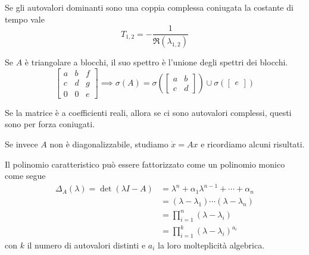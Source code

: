 Se gli autovalori dominanti sono una coppia complessa coniugata la costante di tempo vale
\begin{equation*}
	\boxed{T_{1,2} =-\frac{1}{\Re\left(\lambda _{1,2}\right)}}
\end{equation*}
\begin{rem}
	Se $A$ è triangolare a blocchi, il suo spettro è l'unione degli spettri dei blocchi.
	\begin{equation*}
        \left[
            \begin{array}{cc|c}
			        a & b & f \\
			        c & d & g\\
		          \hline
                  0 & 0 & e
		      \end{array}
        \right] \implies \sigma \left(A\right) =\sigma \left(\begin{bmatrix}
		a & b\\
		c & d
		\end{bmatrix}\right) \cup \sigma \left(\begin{bmatrix}
		e
		\end{bmatrix}\right)
	\end{equation*}
\end{rem}
\begin{rem}
	Se la matrice è a coefficienti reali, allora se ci sono autovalori complessi, questi sono per forza coniugati.
\end{rem}
Se invece $A$ non è diagonalizzabile, studiamo $\dot{x} =Ax$ e ricordiamo alcuni risultati.
\begin{rem}
	Il polinomio caratteristico può essere fattorizzato come un polinomio monico come segue\begin{equation*}
	\begin{aligned}
		\Delta _A\left(\lambda \right) =\det\left(\lambda I-A\right) & =\lambda ^n +\alpha _1 \lambda ^{n-1} +\cdots +\alpha _n                    \\
		                                                                       & =\left(\lambda -\lambda _1\right) \cdots \left(\lambda -\lambda _n\right) \\
		                                                                       & =\prod^n_{i=1}\left(\lambda -\lambda _i\right)                   \\
		                                                                       & =\prod^k_{i=1}\left(\lambda -\lambda _i\right)^{a_i}             
	\end{aligned}
	\end{equation*}
	con $k$ il numero di autovalori distinti e $a_i$ la loro molteplicità algebrica.
\end{rem}
